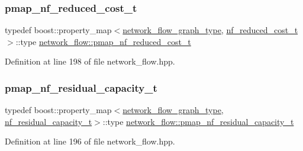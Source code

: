 \mbox{\label{classnetwork__flow_a54ee3bb5e8f6488106a18c778c2ab92e}} 
\subsubsection{\texorpdfstring{pmap\+\_\+nf\+\_\+reduced\+\_\+cost\+\_\+t}{pmap\_nf\_reduced\_cost\_t}}
{\footnotesize\ttfamily typedef boost\+::property\+\_\+map$<$\hyperlink{classnetwork__flow_abfdb8d1baba183c2b121f8c078b9b640}{network\+\_\+flow\+\_\+graph\+\_\+type}, \hyperlink{structnetwork__flow_1_1nf__reduced__cost__t}{nf\+\_\+reduced\+\_\+cost\+\_\+t}$>$\+::type \hyperlink{classnetwork__flow_a54ee3bb5e8f6488106a18c778c2ab92e}{network\+\_\+flow\+::pmap\+\_\+nf\+\_\+reduced\+\_\+cost\+\_\+t}\hspace{0.3cm}{\ttfamily [private]}}



Definition at line 198 of file network\+\_\+flow.\+hpp.

\mbox{\label{classnetwork__flow_a853061022784c1835c390a91e1691839}} 
\subsubsection{\texorpdfstring{pmap\+\_\+nf\+\_\+residual\+\_\+capacity\+\_\+t}{pmap\_nf\_residual\_capacity\_t}}
{\footnotesize\ttfamily typedef boost\+::property\+\_\+map$<$\hyperlink{classnetwork__flow_abfdb8d1baba183c2b121f8c078b9b640}{network\+\_\+flow\+\_\+graph\+\_\+type}, \hyperlink{structnetwork__flow_1_1nf__residual__capacity__t}{nf\+\_\+residual\+\_\+capacity\+\_\+t}$>$\+::type \hyperlink{classnetwork__flow_a853061022784c1835c390a91e1691839}{network\+\_\+flow\+::pmap\+\_\+nf\+\_\+residual\+\_\+capacity\+\_\+t}\hspace{0.3cm}{\ttfamily [private]}}



Definition at line 196 of file network\+\_\+flow.\+hpp.

